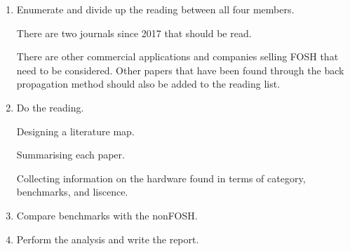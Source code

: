 \documentclass{article}
\begin{document}
\begin{enumerate}
    \item Enumerate and divide up the reading between all four members.
    
        There are two journals since 2017 that should be read. 

        There are other commercial applications and companies selling FOSH that need to be considered. 
        Other papers that have been found through the back propagation method should also be added to the reading list.
        
    \item Do the reading.

        Designing a literature map. 

        Summarising each paper. 

        Collecting information on the hardware found in terms of category, benchmarks, and liscence. 
    \item Compare benchmarks with the nonFOSH.
    \item Perform the analysis and write the report. 
\end{enumerate}


\nocite{*}
\printbibliography
\end{document}
